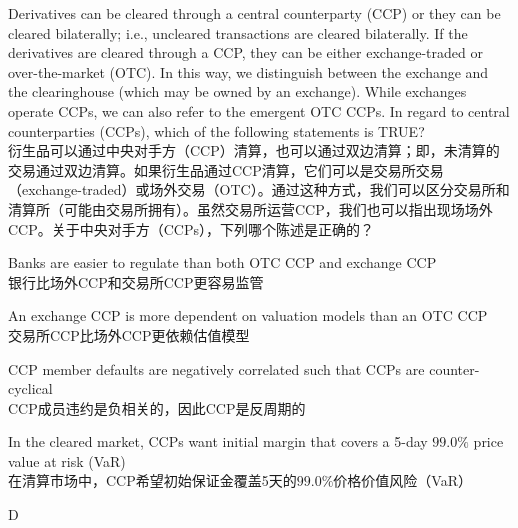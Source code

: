 \documentclass{article}
\newcounter{question} %
\begin{document}
\begin{question}
    Derivatives can be cleared through a central counterparty (CCP) or they can be cleared bilaterally; i.e., uncleared transactions are cleared bilaterally. If the derivatives are cleared through a CCP, they can be either exchange-traded or over-the-market (OTC). In this way, we distinguish between the exchange and the clearinghouse (which may be owned by an exchange). While exchanges operate CCPs, we can also refer to the emergent OTC CCPs. In regard to central counterparties (CCPs), which of the following statements is TRUE?
    \\衍生品可以通过中央对手方（CCP）清算，也可以通过双边清算；即，未清算的交易通过双边清算。如果衍生品通过CCP清算，它们可以是交易所交易（exchange-traded）或场外交易（OTC）。通过这种方式，我们可以区分交易所和清算所（可能由交易所拥有）。虽然交易所运营CCP，我们也可以指出现场场外CCP。关于中央对手方（CCPs），下列哪个陈述是正确的？
\end{question}

\begin{choices}
    \item Banks are easier to regulate than both OTC CCP and exchange CCP
    \\银行比场外CCP和交易所CCP更容易监管
    \item An exchange CCP is more dependent on valuation models than an OTC CCP
    \\交易所CCP比场外CCP更依赖估值模型
    \item CCP member defaults are negatively correlated such that CCPs are counter-cyclical
    \\CCP成员违约是负相关的，因此CCP是反周期的
    \item In the cleared market, CCPs want initial margin that covers a 5-day $99.0\%$ price value at risk (VaR)
    \\在清算市场中，CCP希望初始保证金覆盖5天的$99.0\%$价格价值风险（VaR）
\end{choices}

\begin{correctanswer}
D
\end{correctanswer}
\end{document}
